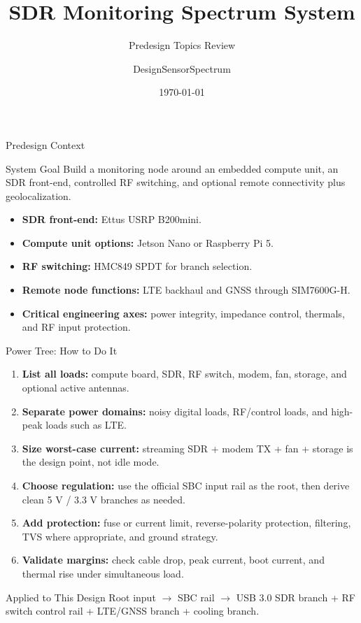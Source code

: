 \documentclass{beamer}
\title{SDR Monitoring Spectrum System}
\subtitle{Predesign Topics Review}
\author{DesignSensorSpectrum}
\date{\today}
\begin{document}
\begin{frame}
    \titlepage
\end{frame}

\begin{frame}{Predesign Context}
    \begin{block}{System Goal}
        Build a monitoring node around an embedded compute unit, an SDR front-end, controlled RF switching, and optional remote connectivity plus geolocalization.
    \end{block}

    \vspace{0.5em}

    \begin{itemize}
        \item \textbf{SDR front-end:} Ettus USRP B200mini.
        \item \textbf{Compute unit options:} Jetson Nano or Raspberry Pi 5.
        \item \textbf{RF switching:} HMC849 SPDT for branch selection.
        \item \textbf{Remote node functions:} LTE backhaul and GNSS through SIM7600G-H.
        \item \textbf{Critical engineering axes:} power integrity, impedance control, thermals, and RF input protection.
    \end{itemize}
\end{frame}

\begin{frame}{Power Tree: How to Do It}
    \scriptsize
    \begin{enumerate}
        \item \textbf{List all loads:} compute board, SDR, RF switch, modem, fan, storage, and optional active antennas.
        \item \textbf{Separate power domains:} noisy digital loads, RF/control loads, and high-peak loads such as LTE.
        \item \textbf{Size worst-case current:} streaming SDR + modem TX + fan + storage is the design point, not idle mode.
        \item \textbf{Choose regulation:} use the official SBC input rail as the root, then derive clean 5 V / 3.3 V branches as needed.
        \item \textbf{Add protection:} fuse or current limit, reverse-polarity protection, filtering, TVS where appropriate, and ground strategy.
        \item \textbf{Validate margins:} check cable drop, peak current, boot current, and thermal rise under simultaneous load.
    \end{enumerate}

    \vspace{0.5em}

    \begin{block}{Applied to This Design}
        Root input $\rightarrow$ SBC rail $\rightarrow$ USB 3.0 SDR branch + RF switch control rail + LTE/GNSS branch + cooling branch.
    \end{block}
\end{frame}
\end{document}
